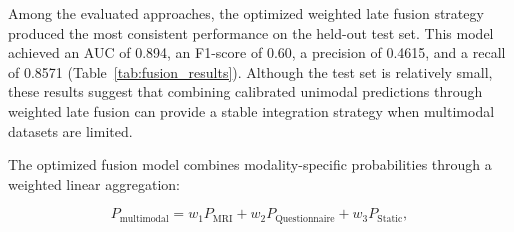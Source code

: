 \documentclass[10pt,letterpaper]{article}
\begin{document}
                                                                                                                          Among the evaluated approaches, the optimized weighted late fusion
                                                                                                                          strategy produced the most consistent performance on the held-out
                                                                                                                          test set. This model achieved an AUC of 0.894, an F1-score of 0.60,
                                                                                                                          a precision of 0.4615, and a recall of 0.8571 (Table~\ref{tab:fusion_results}).
                                                                                                                          Although the test set is relatively small, these results suggest that
                                                                                                                          combining calibrated unimodal predictions through weighted late fusion
                                                                                                                          can provide a stable integration strategy when multimodal datasets are
                                                                                                                          limited.

                                                                                                                          The optimized fusion model combines modality-specific probabilities
                                                                                                                          through a weighted linear aggregation:

                                                                                                                          \begin{equation}
                                                                                                                          \label{eq:late_fusion_3}
                                                                                                                          P_{\text{multimodal}} = w_1 P_{\text{MRI}} + w_2 P_{\text{Questionnaire}} + w_3 P_{\text{Static}},
                                                                                                                          \end{equation}
\end{document}
